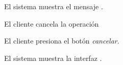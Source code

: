 {\begin{trayectoriaPrincipal}
    \item El sistema muestra el mensaje
      .

  \end{trayectoriaPrincipal}


  \begin{trayectoriaAlternativa}
    {El cliente cancela la operación}

    \item El cliente presiona el botón \textit{cancelar}.

    \item El sistema muestra la interfaz
      .

  \end{trayectoriaAlternativa}

}
